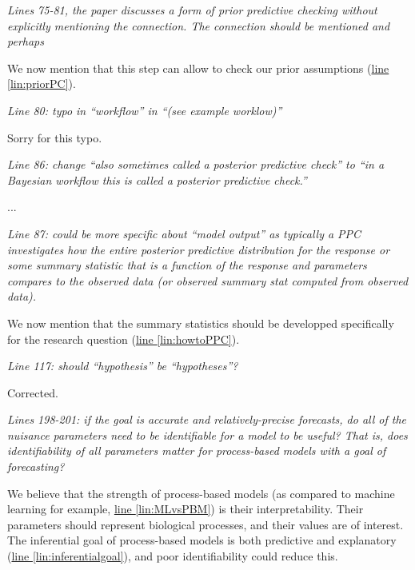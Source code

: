\documentclass[11pt,letter]{article}
\begin{document}
\begin{mybox}
\emph{Lines 75-81, the paper discusses a form of prior predictive checking without explicitly mentioning the connection. The connection should be mentioned and perhaps}
\end{mybox}

We now mention that this step can allow to check our prior assumptions (\href{file:forecastflows_r1\#lintarget:priorPC}{line \ref*{lin:priorPC}}).

\begin{mybox}
\emph{Line 80: typo in “workflow” in “(see example worklow)”}
\end{mybox}

Sorry for this typo.

\begin{mybox}
\emph{Line 86: change “also sometimes called a posterior predictive check” to “in a Bayesian workflow this is called a posterior predictive check.”}
\end{mybox}

...

\begin{mybox}
\emph{Line 87: could be more specific about “model output” as typically a PPC investigates how the entire posterior predictive distribution for the response or some summary statistic that is a function of the response and parameters compares to the observed data (or observed summary stat computed from observed data).}
\end{mybox}

We now mention that the summary statistics should be developped specifically for the research question (\href{file:forecastflows_r1\#lintarget:howtoPPC}{line \ref*{lin:howtoPPC}}). %

\begin{mybox}
\emph{Line 117: should “hypothesis” be “hypotheses”?}
\end{mybox}

Corrected.

\begin{mybox}
\emph{Lines 198-201: if the goal is accurate and relatively-precise forecasts, do all of the nuisance parameters need to be identifiable for a model to be useful? That is, does identifiability of all parameters matter for process-based models with a goal of forecasting?}
\end{mybox}

We believe that the strength of process-based models (as compared to machine learning for example, \href{file:forecastflows_r1\#lintarget:MLvsPBM}{line \ref*{lin:MLvsPBM}}) is their interpretability. Their parameters should represent biological processes, and their values are of interest. The inferential goal of process-based models is both predictive and explanatory (\href{file:forecastflows_r1\#lintarget:inferentialgoal}{line \ref*{lin:inferentialgoal}}), and poor identifiability could reduce this.

\clearpage

\end{document}
